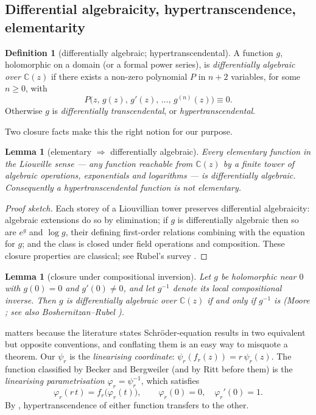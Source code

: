 \documentclass[11pt,a4paper]{article}
\theoremstyle{plain}
\newtheorem{lemma}[theorem]{Lemma}
\theoremstyle{definition}
\newtheorem{definition}{Definition}[section]
\begin{document}
\subsection{Differential algebraicity, hypertranscendence, elementarity}

\begin{definition}[differentially algebraic; hypertranscendental]
\label{def:da}
A function $g$, holomorphic on a domain (or a formal power series), is \emph{differentially algebraic over $\mathbb{C}(z)$} if there exists a non-zero polynomial $P$ in $n+2$ variables, for some $n\ge0$, with
\[
P\bigl(z,\,g(z),\,g'(z),\,\dots,\,g^{(n)}(z)\bigr)\equiv 0 .
\]
Otherwise $g$ is \emph{differentially transcendental}, or \emph{hypertranscendental}.
\end{definition}

Two closure facts make this the right notion for our purpose.

\begin{lemma}[elementary $\Rightarrow$ differentially algebraic]
\label{lem:elem-da}
Every elementary function in the Liouville sense --- any function reachable from $\mathbb{C}(z)$ by a finite tower of algebraic operations, exponentials and logarithms --- is differentially algebraic. Consequently a hypertranscendental function is not elementary.
\end{lemma}

\begin{proof}[Proof sketch]
Each storey of a Liouvillian tower preserves differential algebraicity: algebraic extensions do so by elimination; if $g$ is differentially algebraic then so are $e^{g}$ and $\log g$, their defining first-order relations combining with the equation for $g$; and the class is closed under field operations and composition. These closure properties are classical; see Rubel's survey \cite{Rubel1989}.
\end{proof}

\begin{lemma}[closure under compositional inversion]
\label{lem:inv-da}
Let $g$ be holomorphic near $0$ with $g(0)=0$ and $g'(0)\neq0$, and let $g^{-1}$ denote its local compositional inverse. Then $g$ is differentially algebraic over $\mathbb{C}(z)$ if and only if $g^{-1}$ is (Moore \cite{Moore1896}; see also Boshernitzan--Rubel \cite{BoshernitzanRubel1986}).
\end{lemma}

 matters because the literature states Schr\"oder-equation results in two equivalent but opposite conventions, and conflating them is an easy way to misquote a theorem. Our $\psi_r$ is the \emph{linearising coordinate}: $\psi_r(f_r(z))=r\,\psi_r(z)$. The function classified by Becker and Bergweiler (and by Ritt before them) is the \emph{linearising parametrisation} $\varphi_r=\psi_r^{-1}$, which satisfies
\begin{equation}
\label{eq:schroder-param}
\varphi_r(r\,t)=f_r\bigl(\varphi_r(t)\bigr),
\qquad
\varphi_r(0)=0,\quad \varphi_r'(0)=1 .
\end{equation}
By , hypertranscendence of either function transfers to the other.
\end{document}
